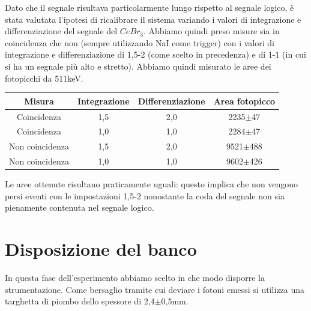 \documentclass[italian,11pt]{report}
\begin{document}
  \vspace{3mm}
  \vspace{3mm}
  \vspace{3mm}
Dato che il segnale risultava particolarmente lungo rispetto al segnale logico, è stata valutata l'ipotesi di ricalibrare il sistema variando i valori di integrazione e differenziazione del segnale del $CeBr_{3}$. Abbiamo quindi preso misure sia in coincidenza che non (sempre utilizzando NaI come trigger) con i valori di integrazione e differenziazione di 1,5-2 (come scelto in precedenza) e di 1-1 (in cui si ha un segnale più alto e stretto). Abbiamo quindi misurato le aree dei fotopicchi da 511keV. 

\vspace{3mm}  

 \begin{center}
    \centering
    \begin{tabular}{cccc}
    \hline
    Misura& Integrazione& Differenziazione& Area fotopicco\\
    \hline\hline
    Coincidenza & 1,5 & 2,0& 2235$\pm$47\\
    Coincidenza & 1,0& 1,0& 2284$\pm$47\\
    Non coincidenza & 1,5 & 2,0& 9521$\pm$488\\
    Non coincidenza& 1,0& 1,0& 9602$\pm$426\\
    
    \hline
    \end{tabular}
    \end{center}
    
    
Le aree ottenute risultano praticamente uguali: questo implica che non vengono persi eventi con le impostazioni 1,5-2 nonostante la coda del segnale non sia pienamente contenuta nel segnale logico. 

\section{Disposizione del banco}
In questa fase dell'esperimento abbiamo scelto in che modo disporre la strumentazione. Come bersaglio tramite cui deviare i fotoni emessi si utilizza una targhetta di piombo dello spessore di 2,4$\pm$0,5mm. 
\end{document}

